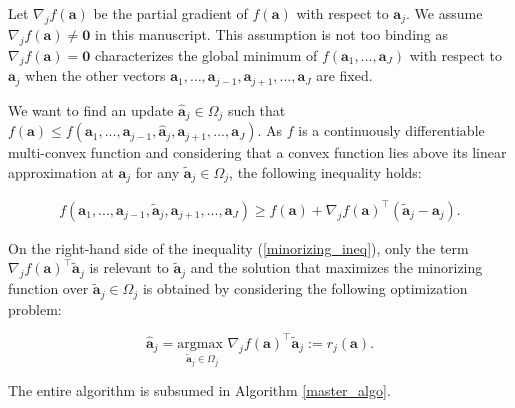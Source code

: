 \documentclass[
]{jss}
\begin{document}
Let \(\nabla_j f( \mathbf a)\) be the partial gradient of
\(f( \mathbf a)\) with respect to \(\mathbf a_j\). We assume
\(\nabla_j f( \mathbf a) \neq \mathbf{0}\) in this manuscript. This
assumption is not too binding as \(\nabla_j f( \mathbf a) = \mathbf{0}\)
characterizes the global minimum of
\(f( \mathbf a_1 , \ldots , \mathbf a_J )\) with respect to
\(\mathbf a_j\) when the other vectors
\(\mathbf a_1 , \ldots , \mathbf a_{j-1} , \mathbf a_{j+1} , \ldots , \mathbf a_J\)
are fixed.

We want to find an update \(\hat{ \mathbf a}_j\in \Omega_j\) such that
\(f( \mathbf a)\leq f( \mathbf a_1, ..., \mathbf a_{j-1}, \hat{ \mathbf a}_j, \mathbf a_{j+1}, ..., \mathbf a_J)\).
As \(f\) is a continuously differentiable multi-convex function and
considering that a convex function lies above its linear approximation
at \(\mathbf a_j\) for any \(\tilde{ \mathbf a}_j\in\Omega_j\), the
following inequality holds:

\begin{equation}
\begin{gathered}
f( \mathbf a_1, ...,  \mathbf a_{j-1}, \tilde{ \mathbf a}_j,  \mathbf a_{j+1}, \ldots,  \mathbf a_J) \geq f( \mathbf a) + \nabla_jf( \mathbf a)^\top(\tilde{ \mathbf a}_j -  \mathbf a_j).
\label{minorizing_ineq}
\end{gathered}
\end{equation}

On the right-hand side of the inequality (\ref{minorizing_ineq}), only
the term \(\nabla_jf( \mathbf a)^\top\tilde{ \mathbf a}_j\) is relevant
to \(\tilde{ \mathbf a}_j\) and the solution that maximizes the
minorizing function over \(\tilde{ \mathbf a}_j\in\Omega_j\) is obtained
by considering the following optimization problem:

\begin{equation}
\hat{ \mathbf a}_j = \underset{\tilde{ \mathbf a}_j\in\Omega_j}{\text{argmax }} \nabla_j f( \mathbf a)^\top \tilde{ \mathbf a}_j := r_j( \mathbf a).
\label{core_update}
\end{equation}

The entire algorithm is subsumed in Algorithm \ref{master_algo}.
\end{document}

